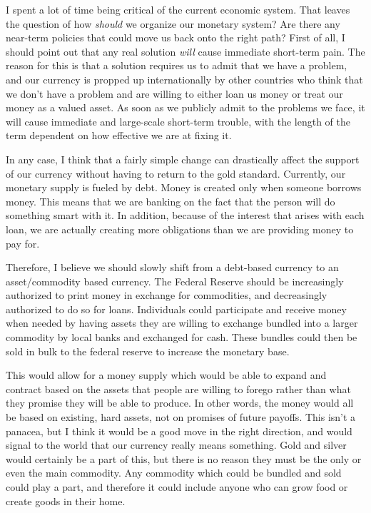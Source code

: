 \begin{policynote}
I spent a lot of time being critical of the current economic system.
That leaves the question of how \textit{should} we organize our monetary system?
Are there any near-term policies that could move us back onto the right path?
First of all, I should point out that any real solution \textit{will} cause immediate 
short-term pain.  The reason for this is that a solution requires us to
admit that we have a problem, and our currency is propped up internationally
by other countries who think that we don't have a problem and are willing to either
loan us money or treat our money as a valued asset.  As soon as we
publicly admit to the problems we face, it will cause immediate and large-scale
short-term trouble, with the length of the term dependent on how effective 
we are at fixing it.  

In any case, I think that a fairly simple change
can drastically affect the support of our currency without having to return
to the gold standard.  Currently, our monetary supply is fueled by debt.
Money is created only when someone borrows money.  This means that we
are banking on the fact that the person will do something smart with it.
In addition, because of the interest that arises with each loan, we are 
actually creating more obligations than we are providing money to pay for.

Therefore, I believe we
should slowly shift from a debt-based currency to an asset/commodity based currency.
The Federal Reserve should be increasingly authorized to print money in exchange for 
commodities, and decreasingly authorized to do so for loans.  
Individuals could participate and receive money when needed by 
having assets they are willing to exchange bundled into a larger commodity by local
banks and exchanged for cash.  These bundles could then be sold in bulk to the federal 
reserve to increase the monetary base.

This would allow
for a money supply which would be able to expand and contract based on 
the assets that people are willing to forego rather than what they 
promise they will be able to produce.  In other words, the money
would all be based on existing, hard assets, not on promises of future
payoffs.  This isn't a panacea, but I think it would be a good move
in the right direction, and would signal to the world that our currency
really means something.  Gold and silver would certainly be a part of this,
but there is no reason they must be the only or even the main commodity.
Any commodity which could be bundled and sold could play a part, and therefore
it could include anyone who can grow food or create goods in their home.
\end{policynote}

